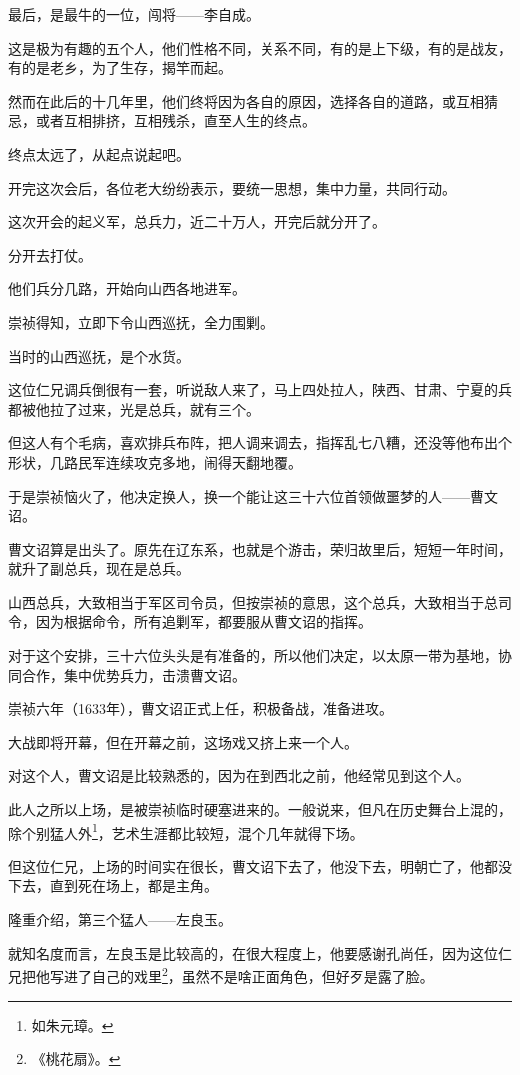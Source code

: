 \begin{multicols}{\theparacolNo}
		最后，是最牛的一位，闯将——李自成。

		这是极为有趣的五个人，他们性格不同，关系不同，有的是上下级，有的是战友，有的是老乡，为了生存，揭竿而起。

		然而在此后的十几年里，他们终将因为各自的原因，选择各自的道路，或互相猜忌，或者互相排挤，互相残杀，直至人生的终点。

		终点太远了，从起点说起吧。

		开完这次会后，各位老大纷纷表示，要统一思想，集中力量，共同行动。

		这次开会的起义军，总兵力，近二十万人，开完后就分开了。

		分开去打仗。

		他们兵分几路，开始向山西各地进军。

		崇祯得知，立即下令山西巡抚，全力围剿。

		当时的山西巡抚，是个水货。

		这位仁兄调兵倒很有一套，听说敌人来了，马上四处拉人，陕西、甘肃、宁夏的兵都被他拉了过来，光是总兵，就有三个。

		但这人有个毛病，喜欢排兵布阵，把人调来调去，指挥乱七八糟，还没等他布出个形状，几路民军连续攻克多地，闹得天翻地覆。

		于是崇祯恼火了，他决定换人，换一个能让这三十六位首领做噩梦的人——曹文诏。

		曹文诏算是出头了。原先在辽东系，也就是个游击，荣归故里后，短短一年时间，就升了副总兵，现在是总兵。

		山西总兵，大致相当于军区司令员，但按崇祯的意思，这个总兵，大致相当于总司令，因为根据命令，所有追剿军，都要服从曹文诏的指挥。

		对于这个安排，三十六位头头是有准备的，所以他们决定，以太原一带为基地，协同合作，集中优势兵力，击溃曹文诏。

		崇祯六年（1633年），曹文诏正式上任，积极备战，准备进攻。

		大战即将开幕，但在开幕之前，这场戏又挤上来一个人。

		对这个人，曹文诏是比较熟悉的，因为在到西北之前，他经常见到这个人。

		此人之所以上场，是被崇祯临时硬塞进来的。一般说来，但凡在历史舞台上混的，除个别猛人外\footnote{如朱元璋。}，艺术生涯都比较短，混个几年就得下场。

		但这位仁兄，上场的时间实在很长，曹文诏下去了，他没下去，明朝亡了，他都没下去，直到死在场上，都是主角。

		隆重介绍，第三个猛人——左良玉。

		就知名度而言，左良玉是比较高的，在很大程度上，他要感谢孔尚任，因为这位仁兄把他写进了自己的戏里\footnote{《桃花扇》。}，虽然不是啥正面角色，但好歹是露了脸。


\end{multicols}
